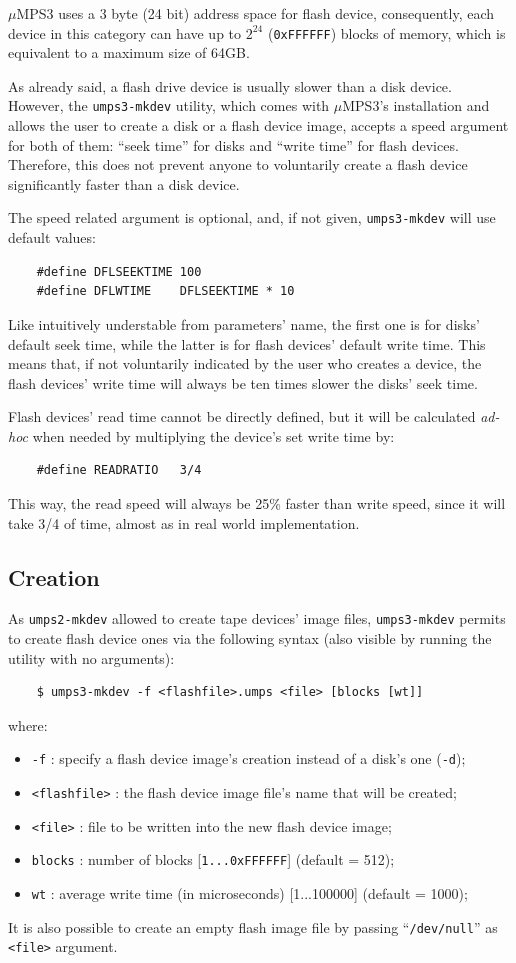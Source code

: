 \documentclass[12pt,a4paper,openright,twoside]{report}
\begin{document}
$\mu$MPS3 uses a 3 byte (24 bit) address space for flash device, consequently, each device in this category can have up to $2^{24}$ (\texttt{0xFFFFFF}) blocks of memory, which is equivalent to a maximum size of 64GB.

As already said, a flash drive device is usually slower than a disk device.
However, the \texttt{umps3-mkdev} utility, which comes with $\mu$MPS3's installation and allows the user to create a disk or a flash device image, accepts a speed argument for both of them: ``seek time'' for disks and ``write time'' for flash devices. Therefore, this does not prevent anyone to voluntarily create a flash device significantly faster than a disk device.

The speed related argument is optional, and, if not given, \texttt{umps3-mkdev} will use default values:
\begin{verbatim}
	#define DFLSEEKTIME 100
	#define DFLWTIME    DFLSEEKTIME * 10
	\end{verbatim}
Like intuitively understable from parameters' name, the first one is for disks' default seek time, while the latter is for flash devices' default write time. This means that, if not voluntarily indicated by the user who creates a device, the flash devices' write time will always be ten times slower the disks' seek time.

Flash devices' read time cannot be directly defined, but it will be calculated \textit{ad-hoc} when needed by multiplying the device's set write time by:
\begin{verbatim}
	#define READRATIO   3/4
	\end{verbatim}
This way, the read speed will always be 25\% faster than write speed, since it will take 3/4 of time, almost as in real world implementation.

\subsection{Creation}
As \texttt{umps2-mkdev} allowed to create tape devices' image files, \texttt{umps3-mkdev} permits to create flash device ones via the following syntax (also visible by running the utility with no arguments):
\begin{verbatim}
	$ umps3-mkdev -f <flashfile>.umps <file> [blocks [wt]]
	\end{verbatim}
where:
\begin{itemize}
	\item	\texttt{-f} : specify a flash device image's creation instead of a disk's one (\texttt{-d});
	\item	\texttt{<flashfile>} : the flash device image file's name that will be created;
	\item	\texttt{<file>} : file to be written into the new flash device image;
	\item	\texttt{blocks} : number of blocks [\texttt{1...0xFFFFFF}] (default = 512);
	\item	\texttt{wt} : average write time (in microseconds) [1...100000] (default = 1000);
\end{itemize}
It is also possible to create an empty flash image file by passing ``\texttt{/dev/null}'' as \texttt{<file>} argument.
\end{document}
